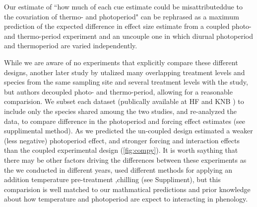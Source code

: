 \documentclass[11pt]{article}
\begin{document}
Our estimate of ``how much of each cue estimate could be misattributeddue to the covariation of thermo- and photoperiod" can be rephrased as a maximum prediction of the expected difference in effect size estimate from a coupled photo- and thermo-period experiment and an uncouple one in which diurnal photoperiod and thermoperiod are varied independently.

While we are aware of no experiments that explicitly compare these different designs, another later study by \citet{Buonaiuto2020} utalized many overlapping treatment levels and species from the same sampling site and several treatment levels with the \citet{Flynn2018} study, but authors decoupled photo- and thermo-period,  allowing for a reasonable comparision. We subset each dataset (publically available at  HF and KNB ) to include only the  species shared amoung the two studies, and re-analyzed the data, to compare difference in the photoperiod and forcing effect estimates (see supplimental method). As we predicted the un-coupled design estimated a weaker (less negative) photoperiod effect, and stronger forcing and interaction effects than the coupled experimental design (\ref{fig:compy}). It is worth saything that there may be other factors driving the differences between these experiments as the we conducted in different years, used different methods for applying an addition temperature pre-treatment ,chilling (see Suppliment), but this comparision is well matched to our mathmatical predictions and prior knowledge about how temperature and photoperiod are expect to interacting in phenology.\\
\end{document}
